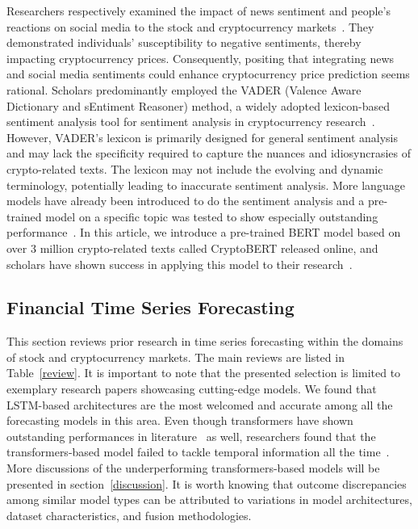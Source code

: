 Researchers respectively examined the impact of news sentiment and people's reactions on social media to the stock and cryptocurrency markets~\cite{chen2023poster,almeida2023systematic}. They demonstrated individuals' susceptibility to negative sentiments, thereby impacting cryptocurrency prices. Consequently, positing that integrating news and social media sentiments could enhance cryptocurrency price prediction seems rational. Scholars predominantly employed the VADER (Valence Aware Dictionary and sEntiment Reasoner) method, a widely adopted lexicon-based sentiment analysis tool for sentiment analysis in cryptocurrency research~\cite{hutto2014vader, gurrib2022predicting, critien2022bitcoin}. However, VADER's lexicon is primarily designed for general sentiment analysis and may lack the specificity required to capture the nuances and idiosyncrasies of crypto-related texts. The lexicon may not include the evolving and dynamic terminology, potentially leading to inaccurate sentiment analysis. More language models have already been introduced to do the sentiment analysis and a pre-trained model on a specific topic was tested to show especially outstanding performance~\cite{min2023recent}. In this article, we introduce a pre-trained BERT model based on over 3 million crypto-related texts called CryptoBERT released online, and scholars have shown success in applying this model to their research~\cite{passalis2022multisource}.

\subsection{Financial Time Series Forecasting}
This section reviews prior research in time series forecasting within the domains of stock and cryptocurrency markets. The main reviews are listed in Table~\ref{review}. It is important to note that the presented selection is limited to exemplary research papers showcasing cutting-edge models. We found that LSTM-based architectures are the most welcomed and accurate among all the forecasting models in this area. Even though transformers have shown outstanding performances in literature~\cite{sridhar2021multi,muhammad2023transformer,yoo2021accurate} as well, researchers found that the transformers-based model failed to tackle temporal information all the time~\cite{zeng2023transformers}. More discussions of the underperforming transformers-based models will be presented in section~\ref{discussion}. It is worth knowing that outcome discrepancies among similar model types can be attributed to variations in model architectures, dataset characteristics, and fusion methodologies.



